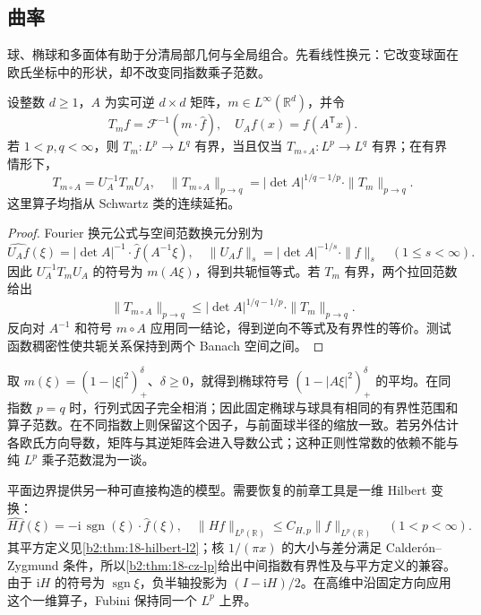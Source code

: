 \subsection{曲率}
\label{b2:subsec:240404}

球、椭球和多面体有助于分清局部几何与全局组合。先看线性换元：它改变球面在欧氏坐标中的形状，却不改变同指数乘子范数。

\begin{proposition}[可逆线性换元下的乘子共轭]\label{b2:prop:24-linear-conjugacy}
设整数 \(d\geq1\)，\(A\) 为实可逆 \(d\times d\) 矩阵，\(m\in L^\infty(\mathbb R^d)\)，并令
\[
 T_mf=\mathcal F^{-1}(m\cdot\widehat f),\quad
 U_Af(x)=f(A^{\mathsf T}x).
\]
若 \(1<p,q<\infty\)，则 \(T_m:L^p\to L^q\) 有界，当且仅当 \(T_{m\circ A}:L^p\to L^q\) 有界；在有界情形下，
\[
 T_{m\circ A}=U_A^{-1}T_mU_A,\quad
 \|T_{m\circ A}\|_{p\to q}
 =|\det A|^{1/q-1/p}\cdot\|T_m\|_{p\to q}.
\]
这里算子均指从 Schwartz 类的连续延拓。
\end{proposition}
\begin{proof}
Fourier 换元公式与空间范数换元分别为
\[
 \widehat{U_Af}(\xi)=|\det A|^{-1}\cdot\widehat f(A^{-1}\xi),\quad
 \|U_Af\|_s=|\det A|^{-1/s}\cdot\|f\|_s
 \quad(1\leq s<\infty).
\]
因此 \(U_A^{-1}T_mU_A\) 的符号为 \(m(A\xi)\)，得到共轭恒等式。若 \(T_m\) 有界，两个拉回范数给出
\[
 \|T_{m\circ A}\|_{p\to q}
 \leq|\det A|^{1/q-1/p}\cdot\|T_m\|_{p\to q}.
\]
反向对 \(A^{-1}\) 和符号 \(m\circ A\) 应用同一结论，得到逆向不等式及有界性的等价。测试函数稠密性使共轭关系保持到两个 Banach 空间之间。
\end{proof}

取 \(m(\xi)=(1-|\xi|^2)_+^\delta\)、\(\delta\geq0\)，就得到椭球符号
\((1-|A\xi|^2)_+^\delta\) 的平均。在同指数 \(p=q\) 时，行列式因子完全相消；因此固定椭球与球具有相同的有界性范围和算子范数。在不同指数上则保留这个因子，与前面球半径的缩放一致。若另外估计各欧氏方向导数，矩阵与其逆矩阵会进入导数公式；这种正则性常数的依赖不能与纯 \(L^p\) 乘子范数混为一谈。

\ProseParagraphBreak
平面边界提供另一种可直接构造的模型。需要恢复的前章工具是一维 Hilbert 变换：
\[
 \widehat{Hf}(\xi)=-\mathrm i\,\operatorname{sgn}(\xi)
                  \cdot\widehat f(\xi),\quad
 \|Hf\|_{L^p(\mathbb R)}\leq C_{H,p}\|f\|_{L^p(\mathbb R)}
 \quad(1<p<\infty).
\]
其平方定义见\cref{b2:thm:18-hilbert-l2}；核 \(1/(\pi x)\) 的大小与差分满足 Calderón--Zygmund 条件，所以\cref{b2:thm:18-cz-lp}给出中间指数有界性及与平方定义的兼容。由于 \(\mathrm iH\) 的符号为 \(\operatorname{sgn}\xi\)，负半轴投影为 \((I-\mathrm iH)/2\)。在高维中沿固定方向应用这个一维算子，Fubini 保持同一个 \(L^p\) 上界。

